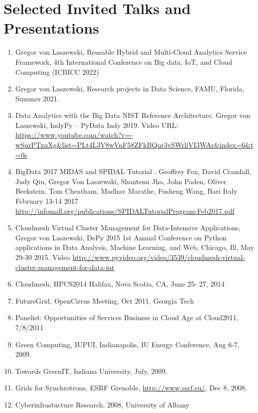 \documentclass{article}
\begin{document}
\pbib



\section{Selected Invited Talks and Presentations} 

\begin{enumerate}

 \item Gregor von Laszewski, Reusable Hybrid and Multi-Cloud Analytics Service Framework,
4th International Conference on Big data, IoT, and Cloud Computing (ICBICC 2022)
\item Gregor von Laszewski, Research projects in Data Science, FAMU, Florida, Summer 2021.
\item  Data Analytics with the Big Data NIST Reference Architecture. Gregor von Laszewski, IndyPy – PyData Indy 2019. Video URL: \url{https://www.youtube.com/watch?v=-wSurPTxuXg&list=PLt4L3V8wVnF58ZFkBQur3vSWrliVI3WAr&index=6&t=0s}
\item  BigData 2017 MIDAS and SPIDAL Tutorial . Geoffrey Fox, David Crandall, Judy Qiu, Gregor Von Laszewski, Shantenu Jha, John Paden, Oliver Beckstein, Tom Cheatham, Madhav Marathe, Fusheng Wang, Bari Italy February 13-14 2017
\url{http://infomall.org/publications/SPIDALTutorialProgram-Feb2017.pdf}
\item  Cloudmesh Virtual Cluster Management for Data-Intensive Applications, Gregor von Laszewski, DePy 2015 1st Annual Conference on Python applications in Data Analysis, Machine Learning, and Web, Chicago, Ill, May 29-30 2015. Video \url{http://www.pyvideo.org/video/3539/cloudmesh-virtual-cluster-management-for-data-int}
\item  Cloudmesh, HPCS2014 Halifax, Nova Scotia, CA, June 25- 27, 2014
\item  FutureGrid, OpenCirrus Meeting, Oct 2011, Georgia Tech
\item  Panelist: Opportunities of Services Business in Cloud Age at Cloud2011, 7/8/2011 
\item  Green Computing,  IUPUI, Indianapolis, IU Energy Conference, Aug 6-7, 2009.
\item  Towards GreenIT, Indiana University, July, 2009. 
\item  Grids for Synchrotrons, ESRF Grenoble, \url{http://www.esrf.eu/}, Dec 8, 2008. 
\item  Cyberinfrastucture Research. 2008, University of Albany 

\end{enumerate}
\end{document}
